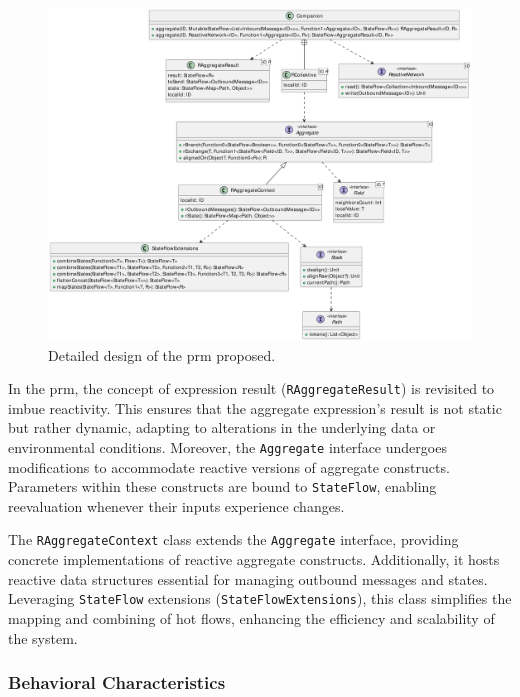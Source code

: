 \begin{figure}[ht!]
    \centering
    \includegraphics[width=\linewidth]{figures/collektive-prm-design.pdf}
    \caption{Detailed design of the \ac{prm} proposed.}
    \label{fig:collektive-prm-design}
\end{figure}

In the \ac{prm}, the concept of expression result (\texttt{RAggregateResult}) is revisited to imbue reactivity. This ensures that the aggregate expression's result is not static but rather dynamic, adapting to alterations in the underlying data or environmental conditions. Moreover, the \texttt{Aggregate} interface undergoes modifications to accommodate reactive versions of aggregate constructs. Parameters within these constructs are bound to \texttt{StateFlow}, enabling reevaluation whenever their inputs experience changes.

The \texttt{RAggregateContext} class extends the \texttt{Aggregate} interface, providing concrete implementations of reactive aggregate constructs. Additionally, it hosts reactive data structures essential for managing outbound messages and states. Leveraging \texttt{StateFlow} extensions (\texttt{StateFlowExtensions}), this class simplifies the mapping and combining of hot flows, enhancing the efficiency and scalability of the system.

\subsubsection{Behavioral Characteristics}

